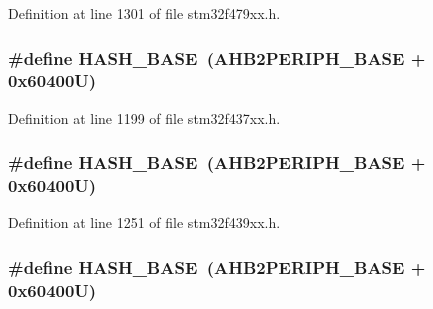 Definition at line 1301 of file stm32f479xx.\+h.

\subsubsection[{\texorpdfstring{H\+A\+S\+H\+\_\+\+B\+A\+SE}{HASH_BASE}}]{\setlength{\rightskip}{0pt plus 5cm}\#define H\+A\+S\+H\+\_\+\+B\+A\+SE~({\bf A\+H\+B2\+P\+E\+R\+I\+P\+H\+\_\+\+B\+A\+SE} + 0x60400\+U)}\hypertarget{group___peripheral__memory__map_ga398d121ca28c3f0f90a140b62184e242}{}\label{group___peripheral__memory__map_ga398d121ca28c3f0f90a140b62184e242}


Definition at line 1199 of file stm32f437xx.\+h.

\subsubsection[{\texorpdfstring{H\+A\+S\+H\+\_\+\+B\+A\+SE}{HASH_BASE}}]{\setlength{\rightskip}{0pt plus 5cm}\#define H\+A\+S\+H\+\_\+\+B\+A\+SE~({\bf A\+H\+B2\+P\+E\+R\+I\+P\+H\+\_\+\+B\+A\+SE} + 0x60400\+U)}\hypertarget{group___peripheral__memory__map_ga398d121ca28c3f0f90a140b62184e242}{}\label{group___peripheral__memory__map_ga398d121ca28c3f0f90a140b62184e242}


Definition at line 1251 of file stm32f439xx.\+h.

\subsubsection[{\texorpdfstring{H\+A\+S\+H\+\_\+\+B\+A\+SE}{HASH_BASE}}]{\setlength{\rightskip}{0pt plus 5cm}\#define H\+A\+S\+H\+\_\+\+B\+A\+SE~({\bf A\+H\+B2\+P\+E\+R\+I\+P\+H\+\_\+\+B\+A\+SE} + 0x60400\+U)}\hypertarget{group___peripheral__memory__map_ga398d121ca28c3f0f90a140b62184e242}{}\label{group___peripheral__memory__map_ga398d121ca28c3f0f90a140b62184e242}


